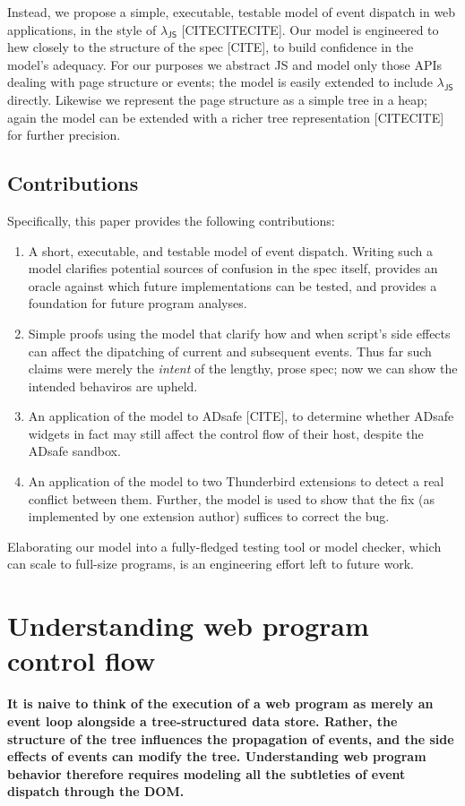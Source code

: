 \documentclass[letterpaper,10pt,twocolumn]{article}
\DeclareRobustCommand{\spec}[1]{\textsf{#1}\xspace}
\DeclareRobustCommand\JS{\spec{JS}}
\DeclareRobustCommand{\LJS}{\ensuremath{\lambda_\JS}\xspace}
\begin{document}
Instead, we propose a simple, executable, testable model of event
dispatch in web applications, in the style of \LJS
[CITECITECITE].  Our model is engineered to hew closely to the
structure of the spec [CITE], to build confidence in the model's
adequacy.  For our purposes we abstract \JS and model only those APIs
dealing with page structure or events; the model is easily extended to
include \LJS directly.  Likewise we represent the page
structure as a simple tree in a heap; again the model can be extended
with a richer tree representation [CITECITE] for further precision.


\subsection{Contributions}
Specifically, this paper provides the following contributions:
\begin{enumerate}
\item A short, executable, and testable model of event dispatch.
  Writing such a model clarifies potential sources of confusion in the
  spec itself, provides an oracle against which future implementations
  can be tested, and provides a foundation for future program analyses.
\item Simple proofs using the model that clarify how and when script's
  side effects can affect the dipatching of current and subsequent
  events.  Thus far such claims were merely the \emph{intent} of the
  lengthy, prose spec; now we can show the intended behaviros are upheld.
\item An application of the model to ADsafe [CITE], to determine
  whether ADsafe widgets in fact may still affect the control flow of
  their host, despite the ADsafe sandbox.
\item An application of the model to two Thunderbird extensions to
  detect a real conflict between them.  Further, the model is used to
  show that the fix (as implemented by one extension author)
  suffices to correct the bug.
\end{enumerate}
Elaborating our model into a fully-fledged testing tool or model
checker, which can scale to full-size programs, is an engineering
effort left to future work.

\section{Understanding web program control flow}\label{sec:c3-architecture}
\textbf{It is naive to think of the execution of a web program as
  merely an event loop alongside a tree-structured data store.
  Rather, the structure of the tree influences the propagation of
  events, and the side effects of events can modify the tree.
  Understanding web program behavior therefore requires modeling all
  the subtleties of event dispatch through the DOM.}
\end{document}
